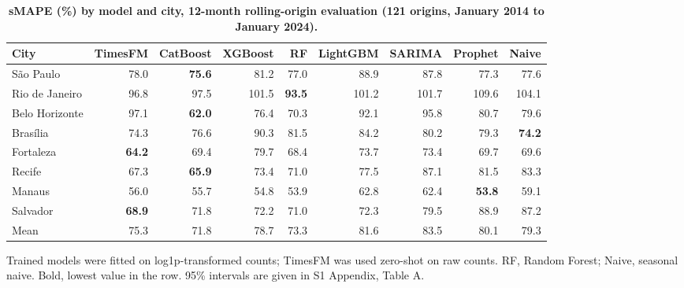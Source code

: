 
\begin{table}[!ht]
\centering
\small
\caption{\textbf{sMAPE (\%) by model and city, 12-month rolling-origin evaluation (121 origins, January 2014 to January 2024).}}
\begin{tabular}{lrrrrrrrr}
\toprule
City & TimesFM & CatBoost & XGBoost & RF & LightGBM & SARIMA & Prophet & Naive \\
\midrule
S\~ao Paulo & 78.0 & \textbf{75.6} & 81.2 & 77.0 & 88.9 & 87.8 & 77.3 & 77.6 \\
Rio de Janeiro & 96.8 & 97.5 & 101.5 & \textbf{93.5} & 101.2 & 101.7 & 109.6 & 104.1 \\
Belo Horizonte & 97.1 & \textbf{62.0} & 76.4 & 70.3 & 92.1 & 95.8 & 80.7 & 79.6 \\
Bras\'ilia & 74.3 & 76.6 & 90.3 & 81.5 & 84.2 & 80.2 & 79.3 & \textbf{74.2} \\
Fortaleza & \textbf{64.2} & 69.4 & 79.7 & 68.4 & 73.7 & 73.4 & 69.7 & 69.6 \\
Recife & 67.3 & \textbf{65.9} & 73.4 & 71.0 & 77.5 & 87.1 & 81.5 & 83.3 \\
Manaus & 56.0 & 55.7 & 54.8 & 53.9 & 62.8 & 62.4 & \textbf{53.8} & 59.1 \\
Salvador & \textbf{68.9} & 71.8 & 72.2 & 71.0 & 72.3 & 79.5 & 88.9 & 87.2 \\
\midrule
Mean & 75.3 & 71.8 & 78.7 & 73.3 & 81.6 & 83.5 & 80.1 & 79.3 \\
\bottomrule
\end{tabular}
\begin{flushleft} Trained models were fitted on log1p-transformed counts; TimesFM was used zero-shot on raw counts. RF, Random Forest; Naive, seasonal naive. Bold, lowest value in the row. 95\% intervals are given in S1 Appendix, Table A.
\end{flushleft}
\label{table2}
\end{table}
